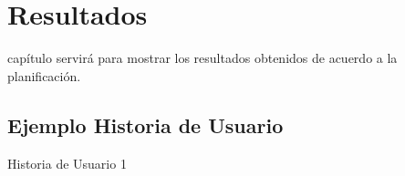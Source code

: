 \chapter{Resultados}
\label{chap:resultados}

 capítulo servirá para mostrar los resultados obtenidos de acuerdo a la planificación.

\section{Ejemplo Historia de Usuario}

\begin{table}[hp]
	\centering
	{\small
		
	}
	\caption[Historia de Usuario 1]
	{Historia de Usuario 1}
	\label{tab:historia1}
\end{table}